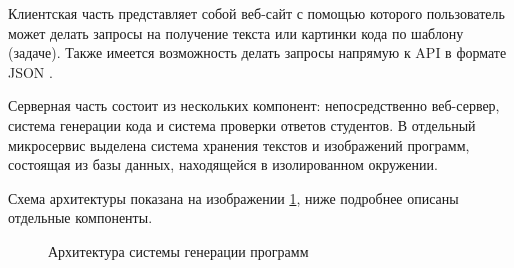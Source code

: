 Клиентская часть представляет собой веб-сайт с помощью которого пользователь может делать
запросы на получение текста или картинки кода по шаблону (задаче). Также имеется возможность
делать запросы напрямую к API в формате JSON \cite{json}.

Серверная часть состоит из нескольких компонент: непосредственно веб-сервер, система генерации
кода и система проверки ответов студентов. В отдельный микросервис выделена система хранения
текстов и изображений программ, состоящая из базы данных, находящейся в изолированном окружении.

Схема архитектуры показана на изображении \ref{architecture}, ниже подробнее описаны отдельные
компоненты.

\begin{figure}[ht]
    \begin{center}
        \caption{\label{architecture} Архитектура системы генерации программ}
    \end{center}
\end{figure}
\clearpage

